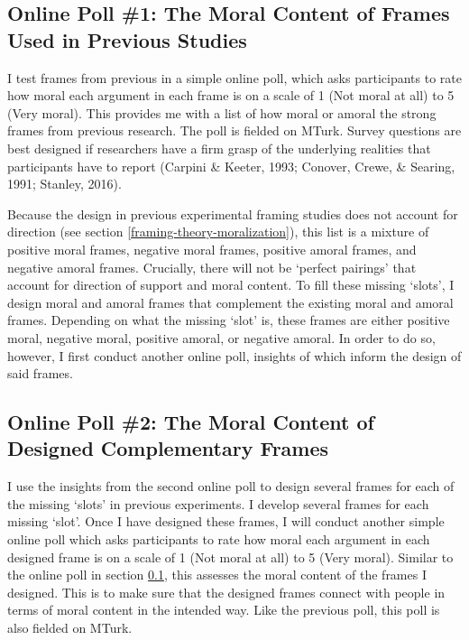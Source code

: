 \documentclass[12pt,econ]{sources/authesis}
\begin{document}
\hypertarget{framing-data-pollprevious}{%
\subsection{Online Poll \#1: The Moral Content of Frames Used in Previous Studies}\label{framing-data-pollprevious}}

I test frames from previous in a simple online poll, which asks participants to rate how moral each argument in each frame is on a scale of 1 (Not moral at all) to 5 (Very moral). This provides me with a list of how moral or amoral the strong frames from previous research. The poll is fielded on MTurk. Survey questions are best designed if researchers have a firm grasp of the underlying realities that participants have to report (Carpini \& Keeter, 1993; Conover, Crewe, \& Searing, 1991; Stanley, 2016).

Because the design in previous experimental framing studies does not account for direction (see section \ref{framing-theory-moralization}), this list is a mixture of positive moral frames, negative moral frames, positive amoral frames, and negative amoral frames. Crucially, there will not be `perfect pairings' that account for direction of support and moral content. To fill these missing `slots', I design moral and amoral frames that complement the existing moral and amoral frames. Depending on what the missing `slot' is, these frames are either positive moral, negative moral, positive amoral, or negative amoral. In order to do so, however, I first conduct another online poll, insights of which inform the design of said frames.

\hypertarget{framing-data-polldesigned}{%
\subsection{Online Poll \#2: The Moral Content of Designed Complementary Frames}\label{framing-data-polldesigned}}

I use the insights from the second online poll to design several frames for each of the missing `slots' in previous experiments. I develop several frames for each missing `slot'. Once I have designed these frames, I will conduct another simple online poll which asks participants to rate how moral each argument in each designed frame is on a scale of 1 (Not moral at all) to 5 (Very moral). Similar to the online poll in section \ref{framing-data-pollprevious}, this assesses the moral content of the frames I designed. This is to make sure that the designed frames connect with people in terms of moral content in the intended way. Like the previous poll, this poll is also fielded on MTurk.
\end{document}
